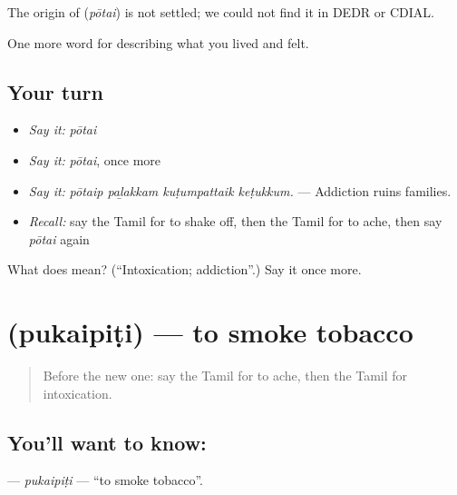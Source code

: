 \begin{cousinweb}
The origin of \textbf{} (\emph{pōtai}) is not settled; we could not find it in DEDR or CDIAL.
\end{cousinweb}

\begin{grammarlens}[title={What you've built}]
One more word for describing what you lived and felt.
\end{grammarlens}

\subsection*{Your turn}
\begin{itemize}
\raggedright
  \item \emph{Say it:} \emph{pōtai}
  \item \emph{Say it:} \emph{pōtai}, once more
  \item \emph{Say it:} \emph{pōtaip paḻakkam kuṭumpattaik keṭukkum.} — Addiction ruins families.
  \item \emph{Recall:} say the Tamil for to shake off, then the Tamil for to ache, then say \emph{pōtai} again
\end{itemize}

\begin{tcolorbox}[breakable,colback=teal!4,colframe=teal!35!black,title={Before you move on}]
What does  mean? (\textquotedblleft{}Intoxication; addiction\textquotedblright{}.) Say it once more.
\end{tcolorbox}
\section[\texorpdfstring{\ta{புகைபிடி} (pukaipiṭi)}{புகைபிடி (pukaipiṭi)}]{ (pukaipiṭi) — to smoke tobacco}

\label{lesson:TA-C491-pukaipiti}



\begin{quote}
Before the new one: say the Tamil for to ache, then the Tamil for intoxication.
\end{quote}

\subsection*{You'll want to know: }
\textbf{} — \emph{pukaipiṭi} — \textquotedblleft{}to smoke tobacco\textquotedblright{}.

